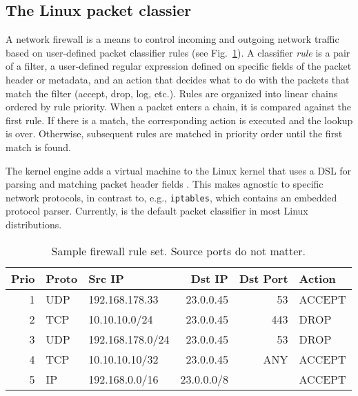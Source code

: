 \subsection{The Linux packet classier}
\label{sec:sa-pack-class}

A network firewall is a means to control incoming and outgoing network traffic based on user-defined packet classifier rules (see Fig.~\ref{fig:class-sample}). %
A classifier \emph{rule} is a pair of a filter, a user-defined regular expression defined on specific fields of the packet header or metadata, and an action that decides what to do with the packets that match the filter (accept, drop, log, etc.).  Rules are organized into linear chains ordered by rule priority. When a packet enters a chain, it is compared against the first rule. If there is a match, the corresponding action is executed and the lookup is over. Otherwise, subsequent rules are matched in priority order until the first match is found.

The \nftables kernel engine adds a virtual machine to the Linux kernel that uses a DSL for parsing and matching packet header fields \cite{nftables}. This makes \nftables agnostic to specific network protocols, in contrast to, e.g., \texttt{iptables}, which contains an embedded protocol parser. Currently, \nftables is the default packet classifier in most Linux distributions.

\begin{table}[t]
  \centering
  \caption{Sample firewall rule set. Source ports do not matter.}
  \label{fig:class-sample}
  \begin{small}
    \renewcommand{\tabcolsep}{2pt}
    \begin{tabular}{r|l|l|r|r|l}
      \textbf{Prio} & \textbf{Proto} & \textbf{Src IP} & \textbf{Dst IP} & \textbf{Dst Port} & \textbf{Action}\\
      \hline
      1 & UDP & 192.168.178.33   & 23.0.0.45  & 53  & ACCEPT\\
      2 & TCP & 10.10.10.0/24    & 23.0.0.45  & 443 & DROP\\
      3 & UDP & 192.168.178.0/24 & 23.0.0.45  & 53  & DROP\\
      4 & TCP & 10.10.10.10/32   & 23.0.0.45  & ANY & ACCEPT\\
      5 & IP  & 192.168.0.0/16   & 23.0.0.0/8 &     & ACCEPT\\
    \end{tabular}
  \end{small}%
\end{table}

